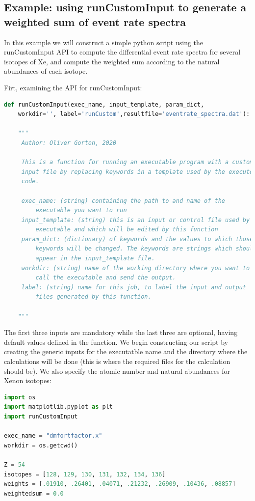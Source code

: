 \documentclass[11pt]{article}
\begin{document}
\subsection{Example: using runCustomInput to generate a weighted sum of
event rate spectra}

In this example we will construct a simple python script using the 
runCustomInput API to compute the differential
event rate spectra for several isotopes of Xe, and compute the weighted sum
according to the natural abundances of each isotope.

Firt, examining the API for runCustomInput:

\begin{lstlisting}[language=python]
def runCustomInput(exec_name, input_template, param_dict,
    workdir='', label='runCustom',resultfile='eventrate_spectra.dat'):

    """
     Author: Oliver Gorton, 2020

     This is a function for running an executable program with a custom
     input file by replacing keywords in a template used by the executed
     code.

     exec_name: (string) containing the path to and name of the
         executable you want to run
     input_template: (string) this is an input or control file used by the 
         executable and which will be edited by this function
     param_dict: (dictionary) of keywords and the values to which those 
         keywords will be changed. The keywords are strings which should 
         appear in the input_template file. 
     workdir: (string) name of the working directory where you want to 
         call the executable and send the output.
     label: (string) name for this job, to label the input and output 
         files generated by this function.

    """
\end{lstlisting}
The first three inputs are mandatory while the last three are optional, having
default values defined in the function.
We begin constructing our script by creating the generic inputs for the
executatble name and the directory where the calculations will be done (this is
where the required files for the calculation should be). We also specify the 
atomic number and natural abundances for Xenon isotopes:
\begin{lstlisting}[language=python]
import os
import matplotlib.pyplot as plt
import runCustomInput

exec_name = "dmfortfactor.x"
workdir = os.getcwd()

Z = 54
isotopes = [128, 129, 130, 131, 132, 134, 136]
weights = [.01910, .26401, .04071, .21232, .26909, .10436, .08857]
weightedsum = 0.0
\end{lstlisting}
\end{document}
